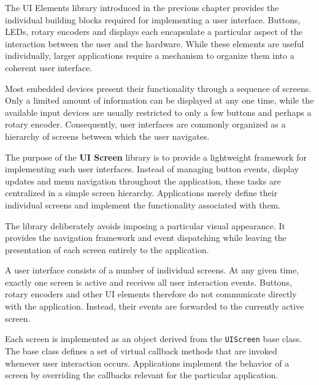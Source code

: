%

The UI Elements library introduced in the previous chapter provides the
individual building blocks required for implementing a user interface. Buttons,
LEDs, rotary encoders and displays each encapsulate a particular aspect of the
interaction between the user and the hardware. While these elements are useful
individually, larger applications require a mechanism to organize them into a
coherent user interface.

Most embedded devices present their functionality through a sequence of screens.
Only a limited amount of information can be displayed at any one time, while the
available input devices are usually restricted to only a few buttons and perhaps
a rotary encoder. Consequently, user interfaces are commonly organized as a
hierarchy of screens between which the user navigates.

The purpose of the \textbf{UI Screen} library is to provide a lightweight
framework for implementing such user interfaces. Instead of managing button
events, display updates and menu navigation throughout the application, these
tasks are centralized in a simple screen hierarchy. Applications merely define
their individual screens and implement the functionality associated with them.

The library deliberately avoids imposing a particular visual appearance. It
provides the navigation framework and event dispatching while leaving the
presentation of each screen entirely to the application.


A user interface consists of a number of individual screens. At any given time,
exactly one screen is active and receives all user interaction events. Buttons,
rotary encoders and other UI elements therefore do not communicate directly with
the application. Instead, their events are forwarded to the currently active
screen.

Each screen is implemented as an object derived from the \texttt{UIScreen} base
class. The base class defines a set of virtual callback methods that are invoked
whenever user interaction occurs. Applications implement the behavior of a
screen by overriding the callbacks relevant for the particular application.


